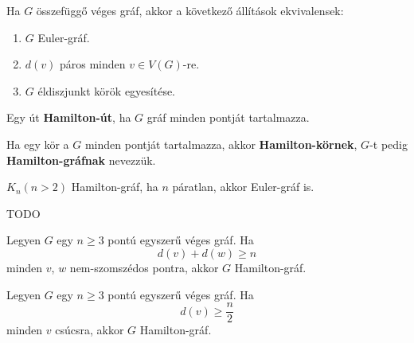 \documentclass[10pt]{article}
\renewcommand{\\}{\par\noindent}
\begin{document}
\begin{frame}
\begin{tcolorbox}[title={Tétel: Euler gráfok}]
Ha $G$ összefüggő véges gráf, akkor a következő állítások ekvivalensek:\\
\begin{enumerate}
\item $G$ Euler-gráf.
\item $d(v)$ páros minden $v \in V(G)$-re.
\item $G$ éldiszjunkt körök egyesítése.
\end{enumerate}
\end{tcolorbox}
\end{frame}

\begin{frame}
\begin{tcolorbox}[title={Def.: Hamilton gráfok}]
Egy út \textbf{Hamilton-út}, ha $G$ gráf minden pontját tartalmazza.\\
\medskip
Ha egy kör a $G$ minden pontját tartalmazza, akkor \textbf{Hamilton-körnek}, $G$-t pedig \textbf{Hamilton-gráfnak} nevezzük.
\end{tcolorbox}

\begin{tcolorbox}[title={Ész}]
$K_n(n > 2)$ Hamilton-gráf, ha $n$ páratlan, akkor Euler-gráf is.
\end{tcolorbox}

\begin{tcolorbox}[title={Példák}]
TODO
\end{tcolorbox}
\end{frame}

\begin{frame}
\begin{tcolorbox}[title={Tétel: Ore tétel}]
Legyen $G$ egy $n \geq 3$ pontú egyszerű véges gráf. Ha $$d(v) + d(w) \geq n$$ minden $v$, $w$ nem-szomszédos pontra, akkor $G$ Hamilton-gráf.
\end{tcolorbox}

\begin{tcolorbox}[title={Tétel: Dirac tétel}]
Legyen $G$ egy $n \geq 3$ pontú egyszerű véges gráf. Ha $$d(v) \geq \frac{n}{2}$$ minden $v$ csúcsra, akkor $G$ Hamilton-gráf.
\end{tcolorbox}
\end{frame}
\end{document}

